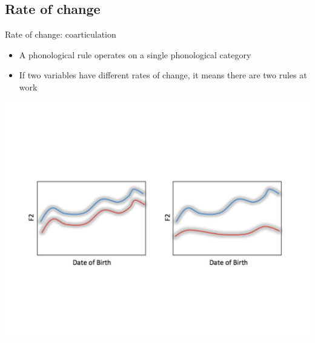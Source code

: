 \documentclass[hyperref={pdfpagelabels=false}]{beamer}
\begin{document}
%
%

\subsection{Rate of change}
\begin{frame}{Rate of change: coarticulation}
	\begin{itemize} 
		\item A phonological rule operates on a single phonological category \citep{fruehwald2013} \pause
		\item If two variables have different rates of change, it means there are two rules at work \pause

	\end{itemize}
	\begin{center}

	\includegraphics[trim=2cm 2cm 2cm 6cm, clip=true, width=1\textwidth]{RateofChangeEx.pdf}

\end{center}\end{frame}
\end{document}
